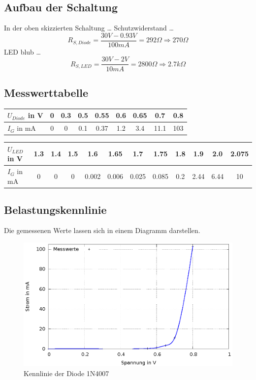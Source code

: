 \documentclass[
a4paper,     %
 headsepline, %
11pt         %
]{scrartcl}  %
\begin{document}
\subsection{Aufbau der Schaltung}

In der oben skizzierten Schaltung … Schutzwiderstand …
\[R_{S,Diode}=\frac{30V-0.93V}{100mA}=292\Omega \Rightarrow 270\Omega\]
LED blub …
\[R_{S,LED}=\frac{30V-2V}{10mA}=2800\Omega \Rightarrow 2.7k\Omega\]

\subsection{Messwerttabelle}

  \begin{tabular}{ l | c | c | c | c | c | c | c | c }
    \hline
    $U_{Diode}$ in V & 0    & 0.3    & 0.5    & 0.55    & 0.6   & 0.65    & 0.7    & 0.8   \\ \hline
    $I_G$ in mA      & 0    & 0      & 0.1    & 0.37    & 1.2   & 3.4     & 11.1   & 103   \\
    \hline
  \end{tabular}
  \newline
  \begin{tabular}{ l | c | c | c | c | c | c | c | c | c | c | c }
    \hline
    $U_{LED}$ in V & 1.3  & 1.4 & 1.5 & 1.6   & 1.65  & 1.7   & 1.75   & 1.8  & 1.9  & 2.0  & 2.075 \\ \hline
    $I_G$ in mA    & 0    & 0   & 0   & 0.002 & 0.006 & 0.025 & 0.085  & 0.2  & 2.44 & 6.44 & 10    \\
    \hline
  \end{tabular}


\subsection{Belastungskennlinie}
Die gemessenen Werte lassen sich in einem Diagramm darstellen.

\begin{figure}[hbtp]
\centering
\includegraphics[scale=1]{kennlinie_diode.eps}
\caption{Kennlinie der Diode 1N4007}
\end{figure}
\end{document}
